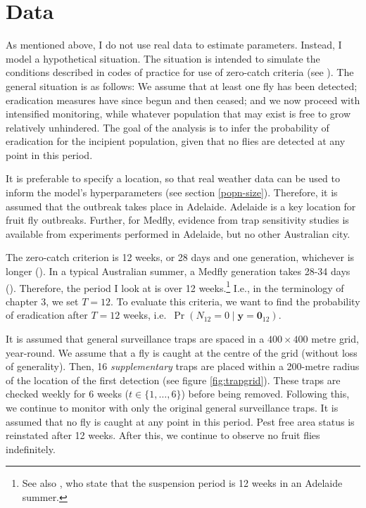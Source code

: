 \documentclass[
  oneside]{book}
\begin{document}
\hypertarget{data}{%
\section{Data}\label{data}}

As mentioned above, I do not use real data to estimate parameters. Instead, I model a hypothetical situation. The situation is intended to simulate the conditions described in codes of practice for use of zero-catch criteria (see \citet{supptraps}). The general situation is as follows: We assume that at least one fly has been detected; eradication measures have since begun and then ceased; and we now proceed with intensified monitoring, while whatever population that may exist is free to grow relatively unhindered. The goal of the analysis is to infer the probability of eradication for the incipient population, given that no flies are detected at any point in this period.

It is preferable to specify a location, so that real weather data can be used to inform the model's hyperparameters (see section \ref{popn-size}). Therefore, it is assumed that the outbreak takes place in Adelaide. Adelaide is a key location for fruit fly outbreaks. Further, for Medfly, evidence from trap sensitivity studies is available from experiments performed in Adelaide, but no other Australian city.

The zero-catch criterion is 12 weeks, or 28 days and one generation, whichever is longer (\citet{meats2005}). In a typical Australian summer, a Medfly generation takes 28-34 days (\citet{dpirdwa}). Therefore, the period I look at is over 12 weeks.\footnote{See also \citet{pirsa}, who state that the suspension period is 12 weeks in an Adelaide summer.} I.e., in the terminology of chapter 3, we set \(T = 12\). To evaluate this criteria, we want to find the probability of eradication after \(T=12\) weeks, i.e.~\(\Pr(N_{12} = 0 \mid \mathbf y = \mathbf 0_{12})\).

It is assumed that general surveillance traps are spaced in a \(400 \times 400\) metre grid, year-round. We assume that a fly is caught at the centre of the grid (without loss of generality). Then, 16 \emph{supplementary} traps are placed within a 200-metre radius of the location of the first detection (see figure \ref{fig:trapgrid}). These traps are checked weekly for 6 weeks (\(t \in \{1, \ldots, 6\}\)) before being removed. Following this, we continue to monitor with only the original general surveillance traps. It is assumed that no fly is caught at any point in this period. Pest free area status is reinstated after 12 weeks. After this, we continue to observe no fruit flies indefinitely.
\end{document}

